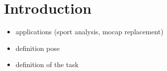 \section{Introduction}


\begin{itemize}
	\item applications (sport analysis, mocap replacement)
	\item definition pose
	\item definition of the task
\end{itemize}